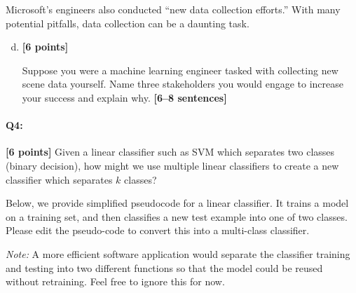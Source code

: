 \pagebreak
Microsoft's engineers also conducted ``new data collection efforts.'' With many potential pitfalls, data collection can be a daunting task.

\begin{enumerate}[(a)]
    \setcounter{enumi}{3}
    \item \textbf{[6 points]}
    \begin{tcolorbox}[colback=orange!5!white,colframe=orange!75!black]
        
    Suppose you were a machine learning engineer tasked with collecting new scene data yourself. Name three stakeholders you would engage to increase your success and explain why. \textbf{[6--8 sentences]}
    \end{tcolorbox}


\end{enumerate}


\pagebreak
\paragraph{Q4:} \textbf{[6 points]} Given a linear classifier such as SVM which separates two classes (binary decision), how might we use multiple linear classifiers to create a new classifier which separates $k$ classes?

\begin{tcolorbox}[colback=orange!5!white,colframe=orange!75!black]
    Below, we provide simplified pseudocode for a linear classifier. It trains a model on a training set, and then classifies a new test example into one of two classes. Please edit the pseudo-code to convert this into a multi-class classifier. 
\end{tcolorbox}

\emph{Note:} A more efficient software application would separate the classifier training and testing into two different functions so that the model could be reused without retraining. Feel free to ignore this for now.

